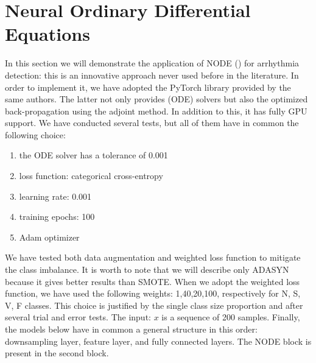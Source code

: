 \documentclass[LaM,binding=0.6cm]{sapthesis}
\begin{document}
\section{Neural Ordinary Differential Equations}
In this section we will demonstrate the application of NODE (\cite{DBLP:journals/corr/abs-1806-07366}) for arrhythmia detection: this is an innovative approach never used before in the literature. In order to implement it, we have adopted the PyTorch library provided by the same authors. The latter not only provides (ODE) solvers but also the optimized back-propagation using the adjoint method. In addition to this, it has fully GPU support. We have conducted several tests, but all of them have in common the following choice:
\begin{enumerate}
\item the ODE solver has a tolerance of 0.001
\item loss function: categorical cross-entropy
\item learning rate: 0.001
\item training epochs: 100
\item Adam optimizer 
\end{enumerate}
We have tested both data augmentation and weighted loss function to mitigate the class imbalance. It is worth to note that we will describe only ADASYN because it gives better results than SMOTE. When we adopt the weighted loss function, we have used the following weights: 1,40,20,100, respectively for N, S, V, F classes. This choice is justified by the single class size proportion and after several trial and error tests. The input: $x$ is a sequence of 200 samples. Finally, the models below have in common a general structure in this order: downsampling layer, feature layer, and fully connected layers. The NODE block is present in the second block.
\end{document}
